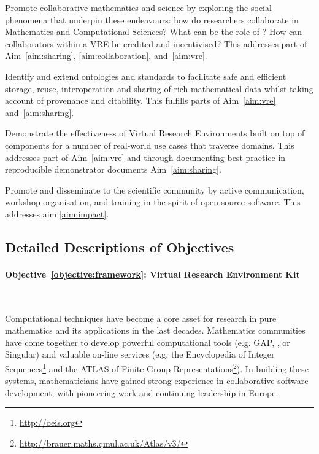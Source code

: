 \documentclass[noworkareas,deliverables,\classoptions]{euproposal}       %
\begin{document}
\begin{proposal}
\begin{compactenum}[\textbf{Objective} 1:]
\item \label{objective:social} Promote collaborative mathematics and
  science by exploring the social phenomena that underpin these
  endeavours: how do researchers collaborate in Mathematics and
  Computational Sciences?  What can be the role of \VREs?  How can
  collaborators within a VRE be credited and incentivised? This
  addresses part of Aim~\ref{aim:sharing}, \ref{aim:collaboration},
  and~\ref{aim:vre}.

\item \label{objective:data} Identify and extend ontologies and
  standards to facilitate safe and efficient storage, reuse,
  interoperation and sharing of rich mathematical data whilst taking
  account of provenance and citability. This fulfills parts of
  Aim~\ref{aim:vre} and~\ref{aim:sharing}.

\item \label{objective:demo} Demonstrate the effectiveness of Virtual
  Research Environments built on top of \TheProject components for a
  number of real-world use cases that traverse domains. This addresses
  part of Aim~\ref{aim:vre} and through documenting best practice in
  reproducible demonstrator documents Aim~\ref{aim:sharing}.

\item \label{objective:disseminate} Promote and disseminate
  \TheProject to the scientific community by active communication,
  workshop organisation, and training in the spirit of open-source
  software. This addresses aim \ref{aim:impact}.


\end{compactenum}

\subsection*{Detailed Descriptions of Objectives} %

\paragraph{Objective~\ref{objective:framework}: Virtual Research
  Environment Kit}\ 

Computational techniques have become a core asset for research in pure
mathematics and its applications in the last decades. Mathematics
communities have come together to develop powerful computational
tools (e.g. GAP, \PariGP, \Sage or Singular) and valuable on-line
services (e.g. the Encyclopedia of Integer Sequences\footnote{\url{http://oeis.org}} and the ATLAS of Finite Group Representations\footnote{
\url{http://brauer.maths.qmul.ac.uk/Atlas/v3/}}). In building these
systems, mathematicians have gained strong experience in collaborative
software development, with pioneering work and continuing leadership
in Europe.


\end{proposal}
\end{document}
